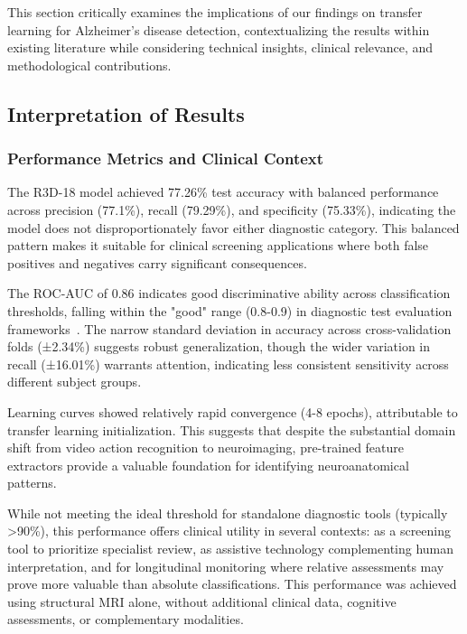 \documentclass[12pt, a4paper]{article}
\begin{document}
This section critically examines the implications of our findings on transfer learning for Alzheimer's disease detection, contextualizing the results within existing literature while considering technical insights, clinical relevance, and methodological contributions.

\subsection{Interpretation of Results}

\subsubsection{Performance Metrics and Clinical Context}

The R3D-18 model achieved 77.26\% test accuracy with balanced performance across precision (77.1\%), recall (79.29\%), and specificity (75.33\%), indicating the model does not disproportionately favor either diagnostic category. This balanced pattern makes it suitable for clinical screening applications where both false positives and negatives carry significant consequences.

The ROC-AUC of 0.86 indicates good discriminative ability across classification thresholds, falling within the "good" range (0.8-0.9) in diagnostic test evaluation frameworks~\cite{mandrekar2010receiver}. The narrow standard deviation in accuracy across cross-validation folds (±2.34\%) suggests robust generalization, though the wider variation in recall (±16.01\%) warrants attention, indicating less consistent sensitivity across different subject groups.

Learning curves showed relatively rapid convergence (4-8 epochs), attributable to transfer learning initialization. This suggests that despite the substantial domain shift from video action recognition to neuroimaging, pre-trained feature extractors provide a valuable foundation for identifying neuroanatomical patterns.

While not meeting the ideal threshold for standalone diagnostic tools (typically >90\%), this performance offers clinical utility in several contexts: as a screening tool to prioritize specialist review, as assistive technology complementing human interpretation, and for longitudinal monitoring where relative assessments may prove more valuable than absolute classifications. This performance was achieved using structural MRI alone, without additional clinical data, cognitive assessments, or complementary modalities.
\end{document}
